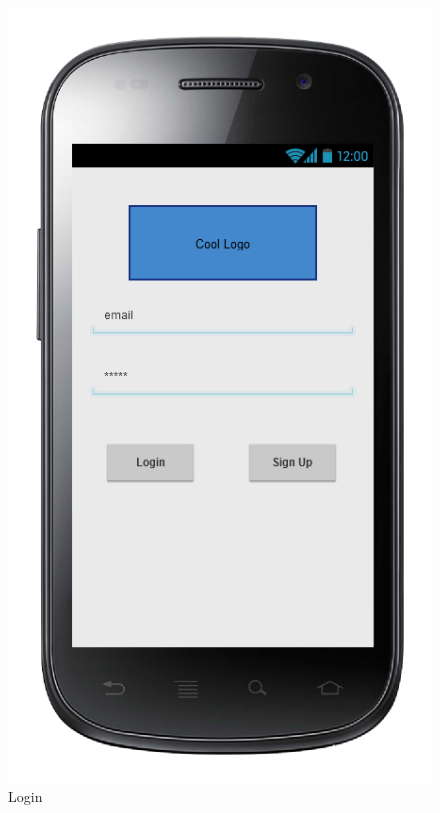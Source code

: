 \begin{center}
\begin{figure} [h]
  	  \includegraphics[scale=0.5]{ui/sequencelogin.png}
\caption{Login}
  
	\end{figure}
\end{center}
